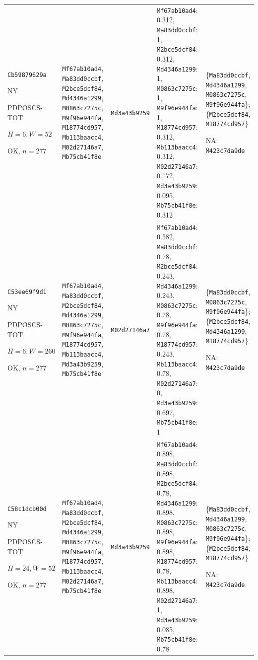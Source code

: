 \begin{longtable}{p{.15\linewidth}p{.17\linewidth}p{.17\linewidth}p{.25\linewidth}p{.14\linewidth}}
\texttt{Cb59879629a}\par NY\par PDPOSCS-\allowbreak{}TOT\par $H=6,W=52$\par OK, $n=277$ & \texttt{Mf67ab10ad4}, \texttt{Ma83dd0ccbf}, \texttt{M2bce5dcf84}, \texttt{Md4346a1299}, \texttt{M0863c7275c}, \texttt{M9f96e944fa}, \texttt{M18774cd957}, \texttt{Mb113baacc4}, \texttt{M02d27146a7}, \texttt{Mb75cb41f8e} & \texttt{Md3a43b9259} & \texttt{Mf67ab10ad4}: 0.312, \texttt{Ma83dd0ccbf}: 1, \texttt{M2bce5dcf84}: 0.312, \texttt{Md4346a1299}: 1, \texttt{M0863c7275c}: 1, \texttt{M9f96e944fa}: 1, \texttt{M18774cd957}: 0.312, \texttt{Mb113baacc4}: 0.312, \texttt{M02d27146a7}: 0.172, \texttt{Md3a43b9259}: 0.095, \texttt{Mb75cb41f8e}: 0.312 & \{\texttt{Ma83dd0ccbf}, \texttt{Md4346a1299}, \texttt{M0863c7275c}, \texttt{M9f96e944fa}\}; \{\texttt{M2bce5dcf84}, \texttt{M18774cd957}\}\par NA: \texttt{M423c7da9de} \\
\texttt{C53ee69f9d1}\par NY\par PDPOSCS-\allowbreak{}TOT\par $H=6,W=260$\par OK, $n=277$ & \texttt{Mf67ab10ad4}, \texttt{Ma83dd0ccbf}, \texttt{M2bce5dcf84}, \texttt{Md4346a1299}, \texttt{M0863c7275c}, \texttt{M9f96e944fa}, \texttt{M18774cd957}, \texttt{Mb113baacc4}, \texttt{Md3a43b9259}, \texttt{Mb75cb41f8e} & \texttt{M02d27146a7} & \texttt{Mf67ab10ad4}: 0.582, \texttt{Ma83dd0ccbf}: 0.78, \texttt{M2bce5dcf84}: 0.243, \texttt{Md4346a1299}: 0.243, \texttt{M0863c7275c}: 0.78, \texttt{M9f96e944fa}: 0.78, \texttt{M18774cd957}: 0.243, \texttt{Mb113baacc4}: 0.78, \texttt{M02d27146a7}: 0, \texttt{Md3a43b9259}: 0.697, \texttt{Mb75cb41f8e}: 1 & \{\texttt{Ma83dd0ccbf}, \texttt{M0863c7275c}, \texttt{M9f96e944fa}\}; \{\texttt{M2bce5dcf84}, \texttt{Md4346a1299}, \texttt{M18774cd957}\}\par NA: \texttt{M423c7da9de} \\
\texttt{C58c1dcb00d}\par NY\par PDPOSCS-\allowbreak{}TOT\par $H=24,W=52$\par OK, $n=277$ & \texttt{Mf67ab10ad4}, \texttt{Ma83dd0ccbf}, \texttt{M2bce5dcf84}, \texttt{Md4346a1299}, \texttt{M0863c7275c}, \texttt{M9f96e944fa}, \texttt{M18774cd957}, \texttt{Mb113baacc4}, \texttt{M02d27146a7}, \texttt{Mb75cb41f8e} & \texttt{Md3a43b9259} & \texttt{Mf67ab10ad4}: 0.898, \texttt{Ma83dd0ccbf}: 0.898, \texttt{M2bce5dcf84}: 0.78, \texttt{Md4346a1299}: 0.898, \texttt{M0863c7275c}: 0.898, \texttt{M9f96e944fa}: 0.898, \texttt{M18774cd957}: 0.78, \texttt{Mb113baacc4}: 0.898, \texttt{M02d27146a7}: 1, \texttt{Md3a43b9259}: 0.085, \texttt{Mb75cb41f8e}: 0.78 & \{\texttt{Ma83dd0ccbf}, \texttt{Md4346a1299}, \texttt{M0863c7275c}, \texttt{M9f96e944fa}\}; \{\texttt{M2bce5dcf84}, \texttt{M18774cd957}\}\par NA: \texttt{M423c7da9de} \\

\end{longtable}
